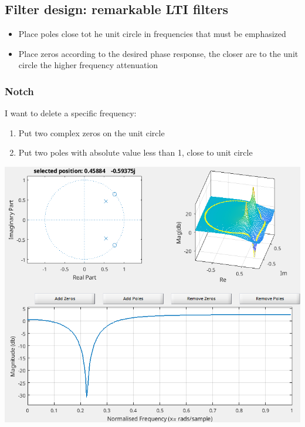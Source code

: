 \subsection{Filter design: remarkable LTI filters}
\begin{itemize}
    \item Place poles close tot he unit circle in frequencies that must be emphasized
    \item Place zeros according to the desired phase response, the closer are to the unit circle the higher frequency attenuation
\end{itemize}

\subsubsection{Notch}
I want to delete a specific frequency:
\begin{enumerate}
    \item Put two complex zeros on the unit circle
    \item Put two poles with absolute value less than 1, close to unit circle
\end{enumerate}
\begin{center}
    \includegraphics[width=1\textwidth]{images/notch.png}
\end{center}

